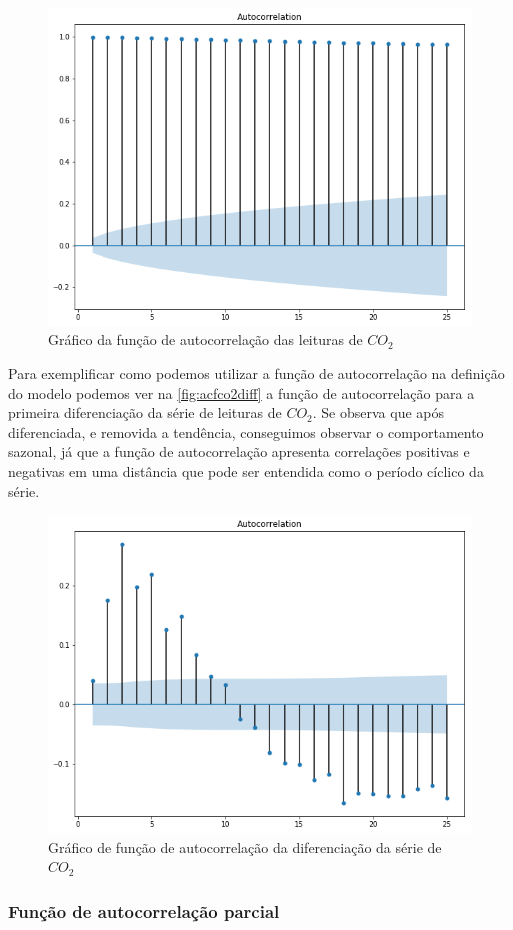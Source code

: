 \documentclass[
    12pt,
    oneside,
    a4paper,
    english,
    brazil
]{abntex2}
\begin{document}
\begin{figure}[ht]
    \centering
    \caption{Gráfico da função de autocorrelação das leituras de
        $CO_2$}\label{fig:correlogramaCo2}
    \includegraphics[width=.5\linewidth]{images/acf_co2.png}
\end{figure}

Para exemplificar como podemos utilizar a função de autocorrelação na definição
do modelo  podemos ver na  \autoref{fig:acfco2diff} a função  de autocorrelação
para a  primeira diferenciação da série  de leituras de $CO_2$.  Se observa que
após diferenciada, e removida a tendência, conseguimos observar o comportamento
sazonal, já  que a função  de autocorrelação apresenta correlações  positivas e
negativas em  uma distância que  pode ser entendida  como o período  cíclico da
série.

\begin{figure}[ht]
    \centering
    \caption{Gráfico de função de autocorrelação da diferenciação da série de
        $CO_2$}\label{fig:acfco2diff}
    \includegraphics[width=.5\linewidth]{images/acf_co2_diff.png}
\end{figure}

\subsubsection{Função de autocorrelação parcial}
\end{document}
